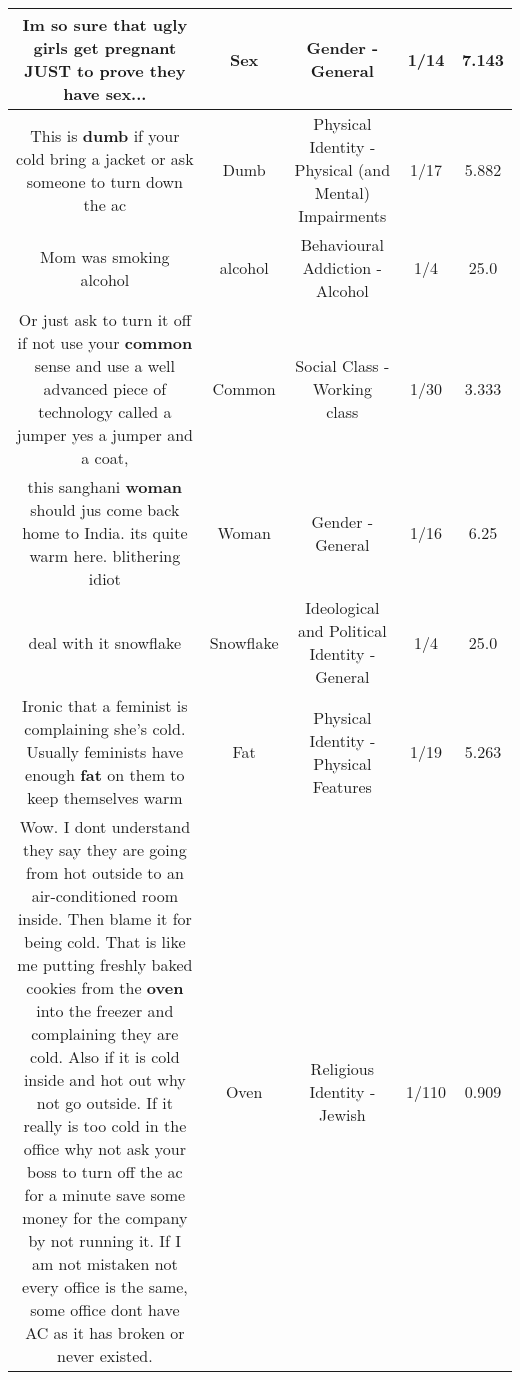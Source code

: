 \documentclass[11pt]{article}
\newlength\mylength
\begin{document}
\begin{center}
\begin{longtable}{|C{.65\mylength}|C{.30\mylength}|C{.12\mylength}|C{.12\mylength}|C{.12\mylength}|}
  \small Im so sure that ugly girls get pregnant JUST to prove they have \textbf{sex}...\normalsize   & Sex & Gender - General & 1/14 & 7.143 \\  \hline
  \small This is \textbf{dumb} if your cold bring a jacket or ask someone to turn down the ac\normalsize   & Dumb & Physical Identity - Physical (and Mental) Impairments & 1/17 & 5.882 \\  \hline
  \small Mom was smoking alcohol\normalsize   & alcohol & Behavioural Addiction - Alcohol & 1/4 & 25.0 \\  \hline
  \small Or just ask to turn it off if not use your \textbf{common} sense and use a well advanced piece of technology called a jumper yes a jumper and a coat,\normalsize   & Common & Social Class - Working class & 1/30 & 3.333 \\  \hline
  \small this sanghani \textbf{woman} should jus come back home to India. its quite warm here. blithering idiot\normalsize   & Woman & Gender - General & 1/16 & 6.25 \\  \hline
  \small deal with it snowflake\normalsize   & Snowflake &  Ideological and Political Identity - General & 1/4 & 25.0 \\  \hline
  \small Ironic that a feminist is complaining she's cold. Usually feminists have enough \textbf{fat} on them to keep themselves warm\normalsize   & Fat & Physical Identity - Physical Features & 1/19 & 5.263 \\  \hline
  \small Wow. I dont understand they say they are going from hot outside to an air-conditioned room inside. Then blame it for being cold. That is like me putting freshly baked cookies from the \textbf{oven} into the freezer and complaining they are cold. Also if it is cold inside and hot out why not go outside. If it really is too cold in the office why not ask your boss to turn off the ac for a minute save some money for the company by not running it. If I am not mistaken not every office is the same, some office dont have AC as it has broken or never existed.\normalsize   & Oven & Religious Identity - Jewish & 1/110 & 0.909 \\  \hline

\end{longtable}
\end{center}
\end{document}
